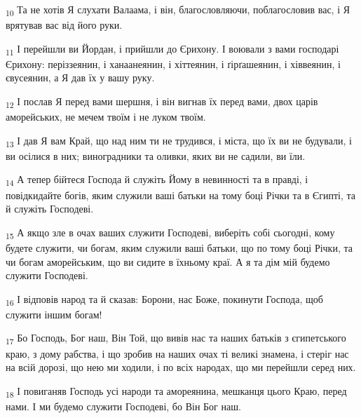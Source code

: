 \begin{tcolorbox}
\textsubscript{10} Та не хотів Я слухати Валаама, і він, благословляючи, поблагословив вас, і Я врятував вас від його руки.
\end{tcolorbox}
\begin{tcolorbox}
\textsubscript{11} І перейшли ви Йордан, і прийшли до Єрихону. І воювали з вами господарі Єрихону: періззеянин, і ханаанеянин, і хіттеянин, і ґірґашеянин, і хіввеянин, і євусеянин, а Я дав їх у вашу руку.
\end{tcolorbox}
\begin{tcolorbox}
\textsubscript{12} І послав Я перед вами шершня, і він вигнав їх перед вами, двох царів аморейських, не мечем твоїм і не луком твоїм.
\end{tcolorbox}
\begin{tcolorbox}
\textsubscript{13} І дав Я вам Край, що над ним ти не трудився, і міста, що їх ви не будували, і ви осілися в них; виноградники та оливки, яких ви не садили, ви їли.
\end{tcolorbox}
\begin{tcolorbox}
\textsubscript{14} А тепер бійтеся Господа й служіть Йому в невинності та в правді, і повідкидайте богів, яким служили ваші батьки на тому боці Річки та в Єгипті, та й служіть Господеві.
\end{tcolorbox}
\begin{tcolorbox}
\textsubscript{15} А якщо зле в очах ваших служити Господеві, виберіть собі сьогодні, кому будете служити, чи богам, яким служили ваші батьки, що по тому боці Річки, та чи богам аморейським, що ви сидите в їхньому краї. А я та дім мій будемо служити Господеві.
\end{tcolorbox}
\begin{tcolorbox}
\textsubscript{16} І відповів народ та й сказав: Борони, нас Боже, покинути Господа, щоб служити іншим богам!
\end{tcolorbox}
\begin{tcolorbox}
\textsubscript{17} Бо Господь, Бог наш, Він Той, що вивів нас та наших батьків з єгипетського краю, з дому рабства, і що зробив на наших очах ті великі знамена, і стеріг нас на всій дорозі, що нею ми ходили, і по всіх народах, що ми перейшли серед них.
\end{tcolorbox}
\begin{tcolorbox}
\textsubscript{18} І повиганяв Господь усі народи та амореянина, мешканця цього Краю, перед нами. І ми будемо служити Господеві, бо Він Бог наш.
\end{tcolorbox}
